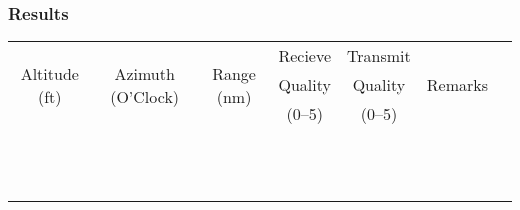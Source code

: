 % 
% 
%
\Large
\subsubsection*{Results}
  \settowidth{\colOne}{Altitude}
  \settowidth{\colTwo}{(O'Clock)}
  \settowidth{\colThree}{Range}
  \settowidth{\colSix}{Remarks}

  \begin{tabularx}{\textwidth}{|c|c|c|c|c|lX|}
    \hline
\multirow{3}{\colOne}{\centering Altitude (ft)}&\multirow{3}{\colTwo}{\centering Azimuth (O'Clock)}&\multirow{3}{\colThree}{\centering Range (nm)}&Recieve&Transmit&\multirow{3}{\colSix}{\centering Remarks}&\\
&&&Quality&Quality&&\\
&&&(0--5)&(0--5)&&\\
    \hline
    \hline
    &&&&&&\\
    \hline
    &&&&&&\\
    \hline
    &&&&&&\\
    \hline
    &&&&&&\\
    \hline
    &&&&&&\\
    \hline
    &&&&&&\\
    \hline
    &&&&&&\\
    \hline
    &&&&&&\\
    \hline
    &&&&&&\\
    \hline
    &&&&&&\\
    \hline
    &&&&&&\\
    \hline
    &&&&&&\\
    \hline
    \end{tabularx}     
    \normalsize

   